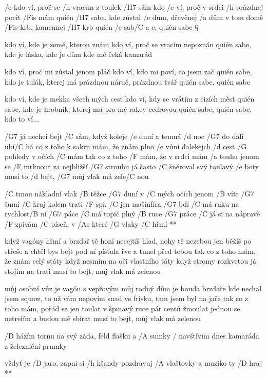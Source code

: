 /e kdo ví, proč se /h vracím z toulek /H7 sám
kdo /e ví, proč v srdci /h prázdnej pocit /Fis mám
quién /H7 sabe, kde zůstal /e dům, dřevěnej /a dům
v tom domě /Fis krb, kamennej /H7 krb
quién /e sab/{C a} e, quién sabe \S

kdo ví, kde je země, kterou znám
kdo ví, proč se vracím nepoznán
quién sabe, kde je láska, kde je dům
kde mě čeká kamarád \s

kdo ví, proč mi zůstal jenom pláč
kdo ví, kdo mi poví, co jsem zač
quién sabe, kdo je tulák, kterej má
prázdnou náruč, prázdnou tvář
quién sabe, quién sabe \s

kdo ví, kde je mekka všech mých cest
kdo ví, kdy se vrátím z cizích měst
quién sabe, kde je hrobník, kterej má
pro mě rakev cedrovou
quién sabe, quién sabe, kdo to ví...




/G7 já nechci bejt /C sám, když koleje /e duní
a temná /d noc /G7 do dáli ubí/C há
co z toho k sakru mám, že znám plno /e vůní
dalekejch /d cest /G pohledy v očích /C mám
tak co z toho /F mám, že v srdci mám /a touhu
jenom se /F mrknout za nejbližší /G7 strouhu
já často /C šněroval svý toulavý /e boty
musí to /d bejt, /G7 můj vlak má zele/C nou

\R /C tmou nákladní vlak /B těžce /G7 duní
   v /C mých očích jenom /B vítr /G7 šumí
   /C kraj kolem trati /F spí, /C jen mašinfíra /G7 bdí
   /C má ruku na rychlost/B ní /G7 páce
   /C má topič plný /B ruce /G7 práce
   /C já si na nápravě /F zpívám
   /C píseň, v /As které /G vlaky /C hřmí **

když vagóny hřmí a brzdař tě honí
necejtíš hlad, nohy tě nezebou
jen běžíš po střeše a chtěl bys bejt pod ní
píšťala řve a tunel před tebou
tak co z toho mám, že znám celý státy
když nesmím na oči vlastního táty
když stromy rozkvetou já stojím na trati
musí to bejt, můj vlak má zelenou \s

můj osobní vůz je vagón s vepřovým
můj rodný dům je bouda brzdaře
kde nechal jsem squaw, to už vám nepovím
snad ve frisku, tam jsem byl na jaře
tak co z toho mám, pořád se jen toulat
v špinavý ruce pár centů žmoulat
jednou se netrefím a budou mě sbírat
musí to bejt, můj vlak má zelenou \s




/D házím tornu na svý záda, feld flašku a /A sumky
/ navštívím dnes kamaráda z železniční prumky

\R vždyť je /D jaro, zapni si /h kšandy
   pozdravuj /A vlaštovky a muziko ty /D hraj **

